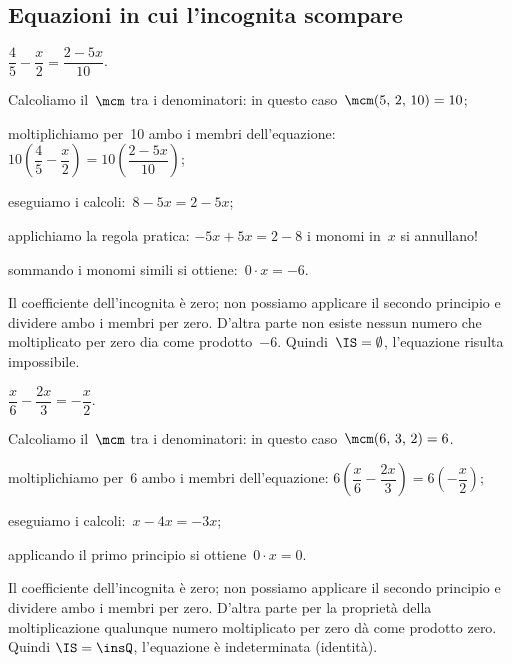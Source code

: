 \ovalbox{\risolvii \ref{ese:15.16}, \ref{ese:15.17}, \ref{ese:15.18}, \ref{ese:15.19}, \ref{ese:15.20}, \ref{ese:15.21}, \ref{ese:15.22}}

\subsection{Equazioni in cui l'incognita scompare}

\begin{exrig}\vspace{1.10ex}
 \begin{esempio}
 $\dfrac{4}{5}-\dfrac{x}{2}=\dfrac{2-5x}{10}$.

\begin{enumeratea}
\item Calcoliamo il~$\mcm$ tra i denominatori: in questo
caso~$\mcm(5\text{,~}2\text{,~}10) = 10$;

\item moltiplichiamo per~10 ambo i membri
dell'equazione:
$10\left(\dfrac{4}{5}-\dfrac{x}{2}\right)=10\left(\dfrac{2-5x}{10}\right)$;

\item eseguiamo i calcoli:~$8-5x=2-5x$;

\item applichiamo la regola pratica:
$-5x+5x=2-8$ i monomi in~$x$ si annullano!

\item sommando i monomi simili si ottiene:~$0\cdot x=-6$.
\end{enumeratea}

Il coefficiente dell'incognita è zero; non possiamo
applicare il secondo principio e dividere ambo i membri per zero.
D'altra parte non esiste nessun numero che moltiplicato
per zero dia come prodotto~$-6$. Quindi~$\IS =\emptyset $,
l'equazione risulta impossibile.
 \end{esempio}
\pagebreak
 \begin{esempio}
$\dfrac{x}{6}-\dfrac{2x}{3}=-{\dfrac{x}{2}}$.

\begin{enumeratea}
\item Calcoliamo il~$\mcm$ tra i denominatori: in questo
caso~$\mcm(6\text{,~}3\text{,~}2) = 6$.

\item moltiplichiamo per~6 ambo i membri
dell'equazione:
$6\left(\dfrac{x}{6}-\dfrac{2x}{3}\right)=6\left(-{\dfrac{x}{2}}\right)$;

\item eseguiamo i calcoli:~$x-4x=-3x$;

\item applicando il primo principio si ottiene~$0\cdot x=0$.

\end{enumeratea}

Il coefficiente dell'incognita è zero; non possiamo
applicare il secondo principio e dividere ambo i membri per zero.
D'altra parte per la proprietà della moltiplicazione
qualunque numero moltiplicato per zero dà come prodotto zero. Quindi
$\IS = \insQ$, l'equazione è indeterminata (identità).
 \end{esempio}
\end{exrig}

